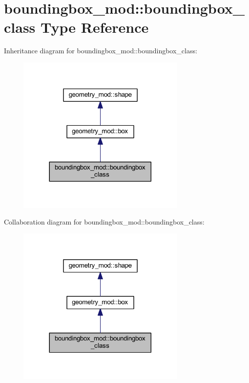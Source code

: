 \hypertarget{structboundingbox__mod_1_1boundingbox__class}{}\section{boundingbox\+\_\+mod\+:\+:boundingbox\+\_\+class Type Reference}
\label{structboundingbox__mod_1_1boundingbox__class}


Inheritance diagram for boundingbox\+\_\+mod\+:\+:boundingbox\+\_\+class\+:
\nopagebreak
\begin{figure}[H]
\begin{center}
\leavevmode
\includegraphics[width=236pt]{structboundingbox__mod_1_1boundingbox__class__inherit__graph}
\end{center}
\end{figure}


Collaboration diagram for boundingbox\+\_\+mod\+:\+:boundingbox\+\_\+class\+:
\nopagebreak
\begin{figure}[H]
\begin{center}
\leavevmode
\includegraphics[width=236pt]{structboundingbox__mod_1_1boundingbox__class__coll__graph}
\end{center}
\end{figure}
